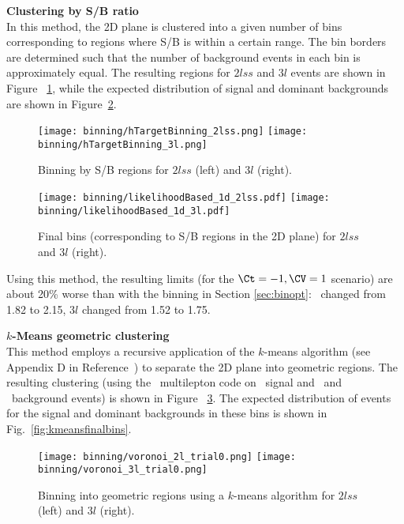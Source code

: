 \textbf{Clustering by S/B ratio}\\
In this method, the 2D plane is clustered into a given number of bins corresponding to regions where S/B is within a certain range. The bin borders are determined such that the number of background events in each bin is approximately equal. The resulting regions for $2lss$ and $3l$  events are shown in Figure ~\ref{fig:sbbinning}, while the expected distribution of signal and dominant backgrounds are shown in Figure~\ref{fig:sbfinalbins}.

\begin{figure} [!h]
  \centering
  \texttt{[image: binning/hTargetBinning\_2lss.png]}
  \texttt{[image: binning/hTargetBinning\_3l.png]}
  \caption{Binning by S/B regions for $2lss$ (left) and $3l$ (right).}
  \label{fig:sbbinning}
\end{figure}

\begin{figure} [!h]
  \centering
  \texttt{[image: binning/likelihoodBased\_1d\_2lss.pdf]}
  \texttt{[image: binning/likelihoodBased\_1d\_3l.pdf]}
  \caption[Final bins (corresponding to S/B regions in the 2D plane)]{Final bins (corresponding to S/B regions in the 2D plane) for $2lss$ and $3l$ (right).}
  \label{fig:sbfinalbins}
\end{figure}

Using this method, the resulting limits (for the $\Ct=-1, \CV=1$ scenario) are about 20\% worse than with the binning in Section \ref{sec:binopt}: \mumu\ changed from 1.82 to 2.15, $3l$ changed from 1.52 to 1.75.

\textbf{$k$-Means geometric clustering}\\
This method employs a recursive application of the $k$-means algorithm (see Appendix D in Reference~\cite{CMS_AN_2017-029}) to separate the 2D plane into geometric regions. The resulting clustering (using the \ttH\ multilepton code on \tHq\ signal and \ttbar\ and \ttV\ background events) is shown in Figure ~\ref{fig:kmeansbinning}. The expected distribution of events for the signal and dominant backgrounds in these bins is shown in Fig.~\ref{fig:kmeansfinalbins}.
\begin{figure} [!h]
  \centering
  \texttt{[image: binning/voronoi\_2l\_trial0.png]}
  \texttt{[image: binning/voronoi\_3l\_trial0.png]}
  \caption[Binning into geometric regions using a $k$-means algorithm.]{Binning into geometric regions using a $k$-means algorithm for $2lss$ (left) and $3l$ (right).}
  \label{fig:kmeansbinning}
\end{figure}


